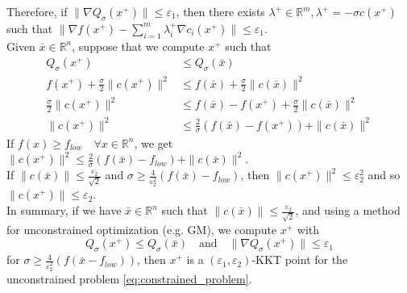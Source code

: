 \documentclass[12pt, openany]{report}
\newcommand{\R}{\mathbb{R}}
\theoremstyle{definition}
\begin{document}
Therefore, if $\| \nabla Q_{\sigma} (x^+) \| \leq \varepsilon_1$, then there exists $\lambda^+ \in \R^m, \lambda^+ = - \sigma c(x^+)$ such that $\|\nabla f(x^+) - \displaystyle \sum_{i=1}^{m} \lambda_i^+ \nabla c_i(x^+)\| \leq \varepsilon_1$.\\
Given $\bar{x} \in \R^n$, suppose that we compute $x^+$ such that
\begin{equation}
	\begin{aligned}
		Q_\sigma(x^+) &\leq Q_\sigma(\bar{x})\\
		f(x^+) + \frac{\sigma}{2} \|c(x^+)\|^2 &\leq f(\bar{x}) + \frac{\sigma}{2} \|c(\bar{x})\|^2\\
		\frac{\sigma}{2} \|c(x^+)\|^2 &\leq f(\bar{x}) - f(x^+) + \frac{\sigma}{2} \|c(\bar{x})\|^2\\
		\|c(x^+)\|^2 &\leq \frac{2}{\sigma} \left( f(\bar{x}) - f(x^+) \right) + \|c(\bar{x})\|^2
	\end{aligned}
\end{equation}
If $f(x) \geq f_{low} \quad \forall x \in \R^n$, we get $\|c(x^+)\|^2 \leq \frac{2}{\sigma} (f(\bar{x}) - f_{low}) + \|c(\bar{x})\|^2$.\\
If $\|c(\bar{x})\| \leq \frac{\varepsilon_2}{\sqrt{2}}$ and $\sigma \geq \frac{4}{\varepsilon_2^2} (f(\bar{x})-f_{low})$, then $\|c(x^+)\|^2 \leq \varepsilon_2^2$ and so $\|c(x^+)\| \leq \varepsilon_2$.\\
In summary, if we have $\bar{x} \in \R^n$ such that $\|c(\bar{x})\| \leq \frac{\varepsilon_2}{\sqrt{2}}$, and using a method for unconstrained optimization (e.g. GM), we compute $x^+$ with
\begin{equation}
	Q_\sigma(x^+) \leq Q_\sigma(\bar{x}) \quad \text{and} \quad \|\nabla Q_\sigma(x^+)\| \leq \varepsilon_1
\end{equation}
for $\sigma \geq \frac{4}{\varepsilon_2^2} (f(\bar{x}-f_{low}))$, then $x^+$ is a $(\varepsilon_1,\varepsilon_2)$-KKT point for the unconstrained problem \eqref{eq:constrained_problem}.\\
\newline
\end{document}
